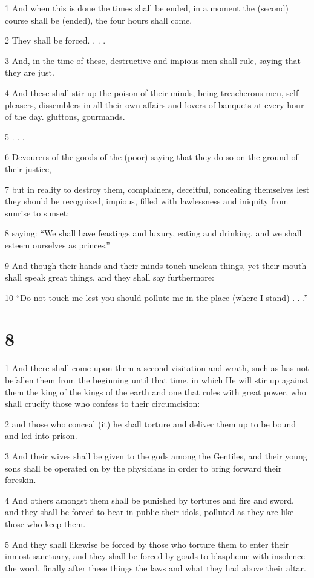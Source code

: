 \par 1 And when this is done the times shall be ended, in a moment the (second) course shall be (ended), the four hours shall come.
\par 2 They shall be forced. . . .
\par 3 And, in the time of these, destructive and impious men shall rule, saying that they are just.
\par 4 And these shall stir up the poison of their minds, being treacherous men, self-pleasers, dissemblers in all their own affairs and lovers of banquets at every hour of the day. gluttons, gourmands.
\par 5 . . . 
\par 6 Devourers of the goods of the (poor) saying that they do so on the ground of their justice,
\par 7 but in reality to destroy them, complainers, deceitful, concealing themselves lest they should be recognized, impious, filled with lawlessness and iniquity from sunrise to sunset:
\par 8 saying: “We shall have feastings and luxury, eating and drinking, and we shall esteem ourselves as princes.”
\par 9 And though their hands and their minds touch unclean things, yet their mouth shall speak great things, and they shall say furthermore:
\par 10 “Do not touch me lest you should pollute me in the place (where I stand) . . .”

\chapter{8}

\par 1 And there shall come upon them a second visitation and wrath, such as has not befallen them from the beginning until that time, in which He will stir up against them the king of the kings of the earth and one that rules with great power, who shall crucify those who confess to their circumcision:
\par 2 and those who conceal (it) he shall torture and deliver them up to be bound and led into prison.
\par 3 And their wives shall be given to the gods among the Gentiles, and their young sons shall be operated on by the physicians in order to bring forward their foreskin.
\par 4 And others amongst them shall be punished by tortures and fire and sword, and they shall be forced to bear in public their idols, polluted as they are like those who keep them.
\par 5 And they shall likewise be forced by those who torture them to enter their inmost sanctuary, and they shall be forced by goads to blaspheme with insolence the word, finally after these things the laws and what they had above their altar.


